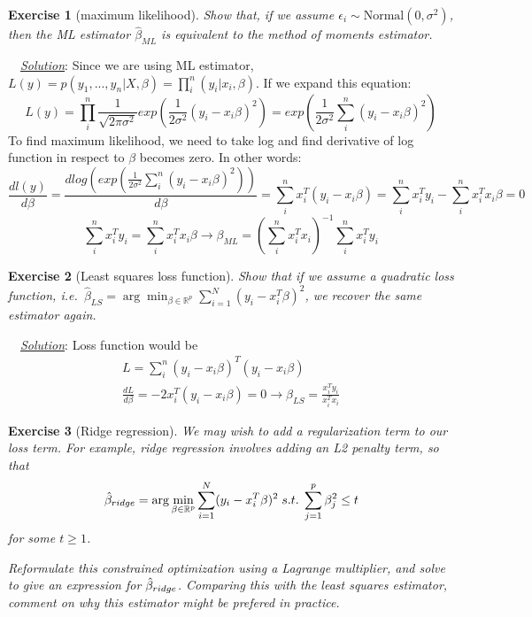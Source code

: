 \documentclass[twoside]{article}
\newcounter{lecnum}
\newtheorem{exercise}{Exercise}[lecnum]
\newenvironment{solution}{
  \begin{flushleft} \noindent ~~\underline{\emph{Solution}}: \rmfamily}{\end{flushleft}}
\begin{document}
\begin{exercise}[maximum likelihood]
  Show that, if we assume $\epsilon_i\sim \mbox{Normal}(0,\sigma^2)$, then the ML estimator $\hat{\beta}_{ML}$ is equivalent to the method of moments estimator.
\end{exercise}

\begin{solution}
Since we are using ML estimator, $L(y) = p(y_1, ..., y_n|X,\beta) = \prod_i^n(y_i|x_i, \beta)$. If we expand this equation: 
\begin{equation*}
L(y) = \prod_i^n \frac{1}{\sqrt{2\pi\sigma^2}}exp(\frac{1}{2\sigma^2} (y_i-x_i\beta)^2) = exp(\frac{1}{2\sigma^2} \sum_i^n(y_i-x_i\beta)^2)
\end{equation*}
To find maximum likelihood, we need to take log and find derivative of log function in respect to $\beta$ becomes zero. In other words:
\begin{equation*}
\frac{d l(y)}{d \beta} = \frac{d log(exp(\frac{1}{2\sigma^2} \sum_i^n(y_i-x_i\beta)^2))}{d \beta} = \sum_i^n x_i^T(y_i-x_i\beta) = \sum_i^n x_i^Ty_i - \sum_i^n x_i^Tx_i\beta = 0
\end{equation*}
\begin{equation*}
\sum_i^n x_i^Ty_i = \sum_i^n x_i^Tx_i \beta \rightarrow \beta_{ML} = (\sum_i^n x_i^Tx_i)^{-1}\sum_i^n x_i^Ty_i 
\end{equation*}
\end{solution}

\begin{exercise}[Least squares loss function]
  Show that if we assume a quadratic loss function, i.e.\ $\hat{\beta}_{LS} = \arg\min_{\beta\in \mathbb{R}^p}\sum_{i=1}^N(y_i - x_i^T\beta)^2$, we recover the same estimator again.
\end{exercise}

\begin{solution}
Loss function would be 
\begin{equation}
\begin{split}
L = \sum_i^n(y_i-x_i\beta)^T(y_i - x_i\beta) \\
\frac{dL}{d\beta} = -2 x_i^T(y_i -x_i\beta) = 0 \rightarrow \beta_{LS} = \frac{x_i^Ty_i}{x_i^Tx_i}
\end{split} 
\end{equation}
\end{solution}

\begin{exercise}[Ridge regression]
  We may wish to add a regularization term to our loss term. For example, ridge regression involves adding an L2 penalty term, so that
  $$\hat{\beta}_{\small{ridge}} = \arg\min_{\beta\in \mathbb{R}^p}\sum_{i=1}^N(y_i - x_i^T\beta)^2 \; s.t. \; \sum_{j=1}^p \beta_j^2 \leq t$$
  for some $t\geq 1$.

  Reformulate this constrained optimization using a Lagrange multiplier, and solve to give an expression for $\hat{\beta}_{\small{ridge}}$. Comparing this with the least squares estimator, comment on why this estimator might be prefered in practice.
\end{exercise}
\end{document}
